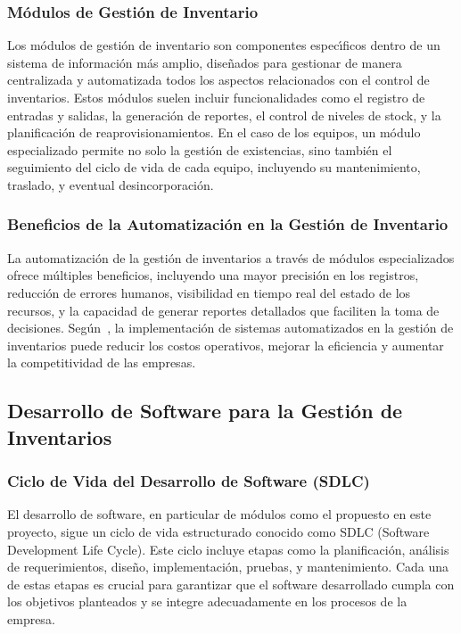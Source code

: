 \documentclass[stu, 12pt, letterpaper, donotrepeattitle, floatsintext, natbib]{apa7}
\begin{document}
\subsubsection{M\'odulos de Gesti\'on de Inventario}
Los m\'odulos de gesti\'on de inventario son componentes espec\'{\i}ficos dentro de un sistema de informaci\'on m\'as amplio, dise\~{n}ados para gestionar de manera
centralizada y automatizada todos los aspectos relacionados con el control de inventarios. Estos m\'odulos suelen incluir funcionalidades como el registro de
entradas y salidas, la generaci\'on de reportes, el control de niveles de stock, y la planificaci\'on de reaprovisionamientos. En el caso de los equipos, un
m\'odulo especializado permite no solo la gesti\'on de existencias, sino tambi\'en el seguimiento del ciclo de vida de cada equipo, incluyendo su mantenimiento,
traslado, y eventual desincorporaci\'on.
\subsubsection{Beneficios de la Automatizaci\'on en la Gesti\'on de Inventario}
La automatizaci\'on de la gesti\'on de inventarios a trav\'es de m\'odulos especializados ofrece m\'ultiples beneficios, incluyendo una mayor precisi\'on en los
registros, reducci\'on de errores humanos, visibilidad en tiempo real del estado de los recursos, y la capacidad de generar reportes detallados que faciliten la toma
de decisiones. Seg\'un~\cite{ll}, la implementaci\'on de sistemas automatizados en la gesti\'on de inventarios puede reducir los costos operativos, mejorar la
eficiencia y aumentar la competitividad de las empresas.
\subsection{Desarrollo de Software para la Gesti\'on de Inventarios}
\subsubsection{Ciclo de Vida del Desarrollo de Software (SDLC)}
El desarrollo de software, en particular de m\'odulos como el propuesto en este proyecto, sigue un ciclo de vida estructurado conocido como SDLC (Software Development
Life Cycle). Este ciclo incluye etapas como la planificaci\'on, an\'alisis de requerimientos, dise\~{n}o, implementaci\'on, pruebas, y mantenimiento. Cada una de
estas etapas es crucial para garantizar que el software desarrollado cumpla con los objetivos planteados y se integre adecuadamente en los procesos de la empresa.
\end{document}
